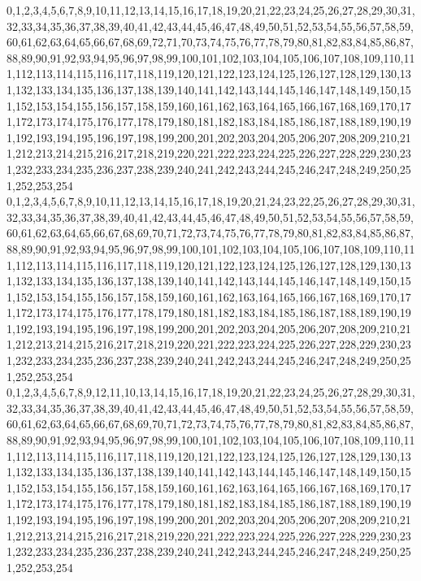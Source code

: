 \documentclass[12pt]{article}
\begin{document}
{0,1,2,3,4,5,6,7,8,9,10,11,12,13,14,15,16,17,18,19,20,21,22,23,24,25,26,27,28,29,30,31,32,33,34,35,36,37,38,39,40,41,42,43,44,45,46,47,48,49,50,51,52,53,54,55,56,57,58,59,60,61,62,63,64,65,66,67,68,69,72,71,70,73,74,75,76,77,78,79,80,81,82,83,84,85,86,87,88,89,90,91,92,93,94,95,96,97,98,99,100,101,102,103,104,105,106,107,108,109,110,111,112,113,114,115,116,117,118,119,120,121,122,123,124,125,126,127,128,129,130,131,132,133,134,135,136,137,138,139,140,141,142,143,144,145,146,147,148,149,150,151,152,153,154,155,156,157,158,159,160,161,162,163,164,165,166,167,168,169,170,171,172,173,174,175,176,177,178,179,180,181,182,183,184,185,186,187,188,189,190,191,192,193,194,195,196,197,198,199,200,201,202,203,204,205,206,207,208,209,210,211,212,213,214,215,216,217,218,219,220,221,222,223,224,225,226,227,228,229,230,231,232,233,234,235,236,237,238,239,240,241,242,243,244,245,246,247,248,249,250,251,252,253,254\\
0,1,2,3,4,5,6,7,8,9,10,11,12,13,14,15,16,17,18,19,20,21,24,23,22,25,26,27,28,29,30,31,32,33,34,35,36,37,38,39,40,41,42,43,44,45,46,47,48,49,50,51,52,53,54,55,56,57,58,59,60,61,62,63,64,65,66,67,68,69,70,71,72,73,74,75,76,77,78,79,80,81,82,83,84,85,86,87,88,89,90,91,92,93,94,95,96,97,98,99,100,101,102,103,104,105,106,107,108,109,110,111,112,113,114,115,116,117,118,119,120,121,122,123,124,125,126,127,128,129,130,131,132,133,134,135,136,137,138,139,140,141,142,143,144,145,146,147,148,149,150,151,152,153,154,155,156,157,158,159,160,161,162,163,164,165,166,167,168,169,170,171,172,173,174,175,176,177,178,179,180,181,182,183,184,185,186,187,188,189,190,191,192,193,194,195,196,197,198,199,200,201,202,203,204,205,206,207,208,209,210,211,212,213,214,215,216,217,218,219,220,221,222,223,224,225,226,227,228,229,230,231,232,233,234,235,236,237,238,239,240,241,242,243,244,245,246,247,248,249,250,251,252,253,254\\
0,1,2,3,4,5,6,7,8,9,12,11,10,13,14,15,16,17,18,19,20,21,22,23,24,25,26,27,28,29,30,31,32,33,34,35,36,37,38,39,40,41,42,43,44,45,46,47,48,49,50,51,52,53,54,55,56,57,58,59,60,61,62,63,64,65,66,67,68,69,70,71,72,73,74,75,76,77,78,79,80,81,82,83,84,85,86,87,88,89,90,91,92,93,94,95,96,97,98,99,100,101,102,103,104,105,106,107,108,109,110,111,112,113,114,115,116,117,118,119,120,121,122,123,124,125,126,127,128,129,130,131,132,133,134,135,136,137,138,139,140,141,142,143,144,145,146,147,148,149,150,151,152,153,154,155,156,157,158,159,160,161,162,163,164,165,166,167,168,169,170,171,172,173,174,175,176,177,178,179,180,181,182,183,184,185,186,187,188,189,190,191,192,193,194,195,196,197,198,199,200,201,202,203,204,205,206,207,208,209,210,211,212,213,214,215,216,217,218,219,220,221,222,223,224,225,226,227,228,229,230,231,232,233,234,235,236,237,238,239,240,241,242,243,244,245,246,247,248,249,250,251,252,253,254\\
}
\end{document}
